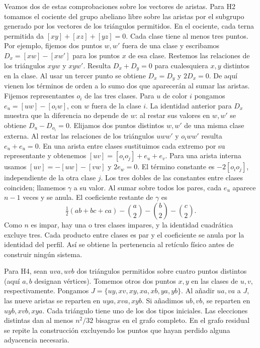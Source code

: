 \documentclass[spanish,11pt,a4paper]{article}
\begin{document}
Veamos dos de estas comprobaciones sobre los vectores de aristas. Para H2 tomamos el cociente del grupo abeliano libre sobre las aristas por el subgrupo generado por los vectores de los triángulos permitidos. En el cociente, cada terna permitida da \([xy]+[xz]+[yz]=0\). Cada clase tiene al menos tres puntos. Por ejemplo, fijemos dos puntos \(w,w'\) fuera de una clase y escribamos \(D_x=[xw]-[xw']\) para los puntos \(x\) de esa clase. Restemos las relaciones de los triángulos \(xyw\) y \(xyw'\). Resulta \(D_x+D_y=0\) para cualesquiera \(x,y\) distintos en la clase. Al usar un tercer punto se obtiene \(D_x=D_y\) y \(2D_x=0\). De aquí vienen los términos de orden a lo sumo dos que aparecerán al sumar las aristas. Fijemos representantes \(o_i\) de las tres clases. Para \(u\) de color \(i\) pongamos \(e_u=[uw]-[o_iw]\), con \(w\) fuera de la clase \(i\). La identidad anterior para \(D_x\) muestra que la diferencia no depende de \(w\): al restar sus valores en \(w,w'\) se obtiene \(D_u-D_{o_i}=0\). Elijamos dos puntos distintos \(w,w'\) de una misma clase externa. Al restar las relaciones de los triángulos \(uww'\) y \(o_iww'\) resulta \(e_u+e_u=0\). En una arista entre clases sustituimos cada extremo por su representante y obtenemos \([uv]=[o_io_j]+e_u+e_v\). Para una arista interna usamos \([uv]=-[uw]-[vw]\) y \(2e_w=0\). El término constante es \(-2[o_io_j]\), independiente de la otra clase \(j\). Los tres dobles de las constantes entre clases coinciden; llamemos \(\gamma\) a su valor. Al sumar sobre todos los pares, cada \(e_u\) aparece \(n-1\) veces y se anula. El coeficiente restante de \(\gamma\) es \[\tfrac12(ab+bc+ca)-\binom a2-\binom b2-\binom c2.\] Como \(n\) es impar, hay una o tres clases impares, y la identidad cuadrática excluye tres. Cada producto entre clases es par y el coeficiente se anula por la identidad del perfil. Así se obtiene la pertenencia al retículo físico antes de construir ningún sistema.

Para H4, sean \(uva,uvb\) dos triángulos permitidos sobre cuatro puntos distintos (aquí \(a,b\) designan vértices). Tomemos otros dos puntos \(x,y\) en las clases de \(u,v\), respectivamente. Pongamos \(J=\{uy,xv,xy,xa,xb,ya,yb\}\). Al añadir \(ua,va\) a \(J\), las nueve aristas se reparten en \(uya,xva,xyb\). Si añadimos \(ub,vb\), se reparten en \(uyb,xvb,xya\). Cada triángulo tiene uno de los dos tipos iniciales. Las elecciones distintas dan al menos \(n^2/32\) bisagras en el grafo completo. En el grafo residual se repite la construcción excluyendo los puntos que hayan perdido alguna adyacencia necesaria.
\end{document}
